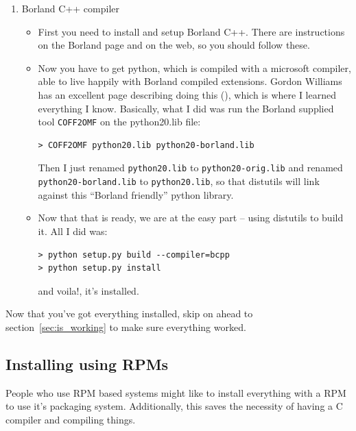 \documentclass{report}
\begin{document}
\begin{enumerate}
  \item Borland C++ compiler

\begin{itemize}
  \item First you need to install and setup Borland C++. There are instructions on the Borland page and on the web, so you should follow these.
 
  \item Now you have to get python, which is compiled with a microsoft compiler, able to live happily with Borland compiled extensions. Gordon Williams has an excellent page describing doing this (), which is where I learned everything I know. Basically, what I did was run the Borland supplied tool \verb|COFF2OMF| on the python20.lib file:

\begin{verbatim}
> COFF2OMF python20.lib python20-borland.lib
\end{verbatim}

Then I just renamed \verb|python20.lib| to \verb|python20-orig.lib| and renamed \verb|python20-borland.lib| to \verb|python20.lib|, so that distutils will link against this ``Borland friendly'' python library.

  \item Now that that is ready, we are at the easy part -- using distutils to build it. All I did was:

\begin{verbatim}
> python setup.py build --compiler=bcpp
> python setup.py install
\end{verbatim}

and voila!, it's installed. 

\end{itemize}

\end{enumerate}

Now that you've got everything installed, skip on ahead to section~\ref{sec:is_working} to make sure everything worked.

\subsection{Installing using RPMs}

People who use RPM based systems might like to install everything with a RPM to use it's packaging system. Additionally, this saves the necessity of having a C compiler and compiling things. 
\end{document}
